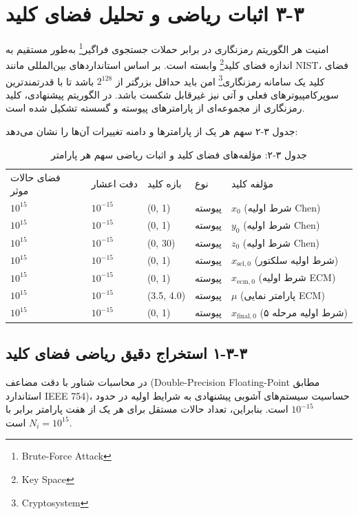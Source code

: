 \section{‏۳‏-‏۳‏ اثبات ریاضی و تحلیل فضای کلید}

امنیت هر الگوریتم رمزنگاری در برابر حملات جستجوی فراگیر\footnote{Brute-Force Attack} به‌طور مستقیم به اندازه فضای کلید\footnote{Key Space} وابسته است. بر اساس استانداردهای بین‌المللی مانند NIST، فضای کلید یک سامانه رمزنگاری\footnote{Cryptosystem} امن باید حداقل بزرگتر از $2^{128}$ باشد تا با قدرتمندترین سوپرکامپیوترهای فعلی و آتی نیز غیرقابل شکست باشد. در الگوریتم پیشنهادی، کلید رمزنگاری از مجموعه‌ای از پارامترهای پیوسته و گسسته تشکیل شده است.

جدول ۳-۲ سهم هر یک از پارامترها و دامنه تغییرات آن‌ها را نشان می‌دهد:

\begin{table}[h]
\centering
\small
\begin{tabular}{lllll}
\hline
فضای حالات موثر & دقت اعشار & بازه کلید & نوع & مؤلفه کلید \\
$10^{15}$ & $10^{-15}$ & (0, 1) & پیوسته & $x_0$ (شرط اولیه Chen) \\
$10^{15}$ & $10^{-15}$ & (0, 1) & پیوسته & $y_0$ (شرط اولیه Chen) \\
$10^{15}$ & $10^{-15}$ & (0, 30) & پیوسته & $z_0$ (شرط اولیه Chen) \\
$10^{15}$ & $10^{-15}$ & (0, 1) & پیوسته & $x_{\mathrm{sel},0}$ (شرط اولیه سلکتور) \\
$10^{15}$ & $10^{-15}$ & (0, 1) & پیوسته & $x_{\mathrm{ecm},0}$ (شرط اولیه ECM) \\
$10^{15}$ & $10^{-15}$ & (3.5, 4.0) & پیوسته & $\mu$ (پارامتر نمایی ECM) \\
$10^{15}$ & $10^{-15}$ & (0, 1) & پیوسته & $x_{\mathrm{final},0}$ (شرط اولیه مرحله ۵) \\
\hline
\end{tabular}
\caption{جدول ‏۳‏-‏۲‏: مؤلفه‌های فضای کلید و اثبات ریاضی سهم هر پارامتر}
\end{table}

\subsection{‏۳‏-‏۳‏-‏۱‏ استخراج دقیق ریاضی فضای کلید}

در محاسبات شناور با دقت مضاعف (Double-Precision Floating-Point مطابق استاندارد IEEE 754)، حساسیت سیستم‌های آشوبی پیشنهادی به شرایط اولیه در حدود $10^{-15}$ است. بنابراین، تعداد حالات مستقل برای هر یک از هفت پارامتر برابر با $N_i = 10^{15}$ است.

